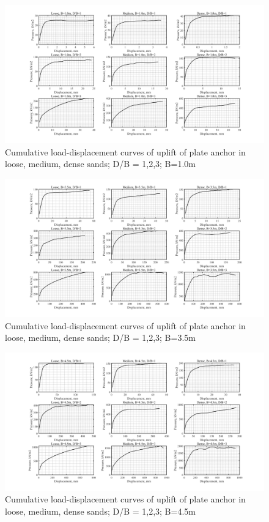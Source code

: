 \documentclass[a4paper, nobind]{templates/ociamthesis}
\begin{document}
\begin{landscape}
\begin{figure}[H]
\includegraphics[width=1\linewidth]{myfigureeeeee/CodeC} \caption{Cumulative load-displacement curves of uplift of plate anchor in loose, medium, dense sands; D/B = 1,2,3; B=1.0m}\label{fig:unnamed-chunk-55}
\end{figure}

\begin{figure}[H]
\includegraphics[width=1\linewidth]{myfigureeeeee/CodeD} \caption{Cumulative load-displacement curves of uplift of plate anchor in loose, medium, dense sands; D/B = 1,2,3; B=3.5m}\label{fig:unnamed-chunk-56}
\end{figure}

\begin{figure}[H]
\includegraphics[width=1\linewidth]{myfigureeeeee/CodeE} \caption{Cumulative load-displacement curves of uplift of plate anchor in loose, medium, dense sands; D/B = 1,2,3; B=4.5m}\label{fig:unnamed-chunk-57}
\end{figure}


\end{landscape}
\end{document}
